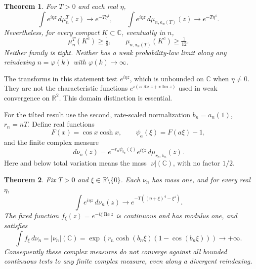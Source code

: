 \documentclass[11pt]{article}
\newtheorem{theorem}{Theorem}[section]
\newcommand{\C}{\mathbb C}\newcommand{\R}{\mathbb R}
\begin{document}
\begin{theorem}\label{thm:positive}
For $T>0$ and each real $\eta$,
\[
 \int e^{i\eta z}\,d\mu_n^T(z)\longrightarrow e^{-T\eta^4},\qquad
 \int e^{i\eta z}\,d\mu_{n,a_n(T)}(z)\longrightarrow e^{-T\eta^4}.
\]
Nevertheless, for every compact $K\subset\C$, eventually in $n$,
\[
 \mu_n^T(K^c)\geq\tfrac18,\qquad
 \mu_{n,a_n(T)}(K^c)\geq\tfrac1{12}.
\]
Neither family is tight. Neither has a weak probability-law limit along
any reindexing $n=\varphi(k)$ with $\varphi(k)\to\infty$.
\end{theorem}

The transforms in this statement test $e^{i\eta z}$, which is unbounded on
$\C$ when $\eta\ne0$. They are not the characteristic functions
$e^{i(u\operatorname{Re}z+v\operatorname{Im}z)}$ used in weak convergence
on $\R^2$. This domain distinction is essential.

For the tilted result use the second, rate-scaled normalization
$b_n=a_n(1)$, $r_n=nT$. Define real functions
\[
 F(x)=\cos x\cosh x,\qquad \psi_a(\xi)=F(a\xi)-1,
\]
and the finite complex measure
\begin{equation}\label{eq:tilt}
 d\nu_n(z)=e^{-r_n\psi_{b_n}(\xi)}e^{i\xi z}\,d\mu_{r_n,b_n}(z).
\end{equation}
Here and below total variation means the mass $|\nu|(\C)$, with no factor
$1/2$.

\begin{theorem}\label{thm:tilt}
Fix $T>0$ and $\xi\in\R\setminus\{0\}$. Each $\nu_n$ has mass one, and
for every real $\eta$,
\begin{equation}\label{eq:tiltlimit}
 \int e^{i\eta z}\,d\nu_n(z)
 \longrightarrow e^{-T((\eta+\xi)^4-\xi^4)}.
\end{equation}
The fixed function $f_\xi(z)=e^{-i\xi\operatorname{Re}z}$ is continuous
and has modulus one, and satisfies
\begin{equation}\label{eq:fixed}
 \int f_\xi\,d\nu_n=|\nu_n|(\C)
 =\exp\!\left(r_n\cosh(b_n\xi)(1-\cos(b_n\xi))\right)
 \longrightarrow+\infty.
\end{equation}
Consequently these complex measures do not converge against all bounded
continuous tests to any finite complex measure, even along a divergent
reindexing.
\end{theorem}
\end{document}

